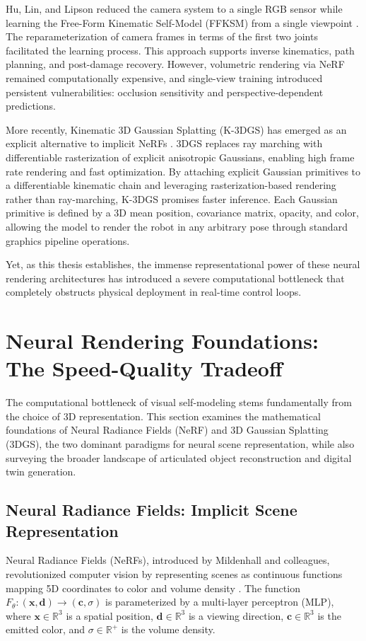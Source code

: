 \documentclass[12pt,a4paper,oneside]{report}
\begin{document}
Hu, Lin, and Lipson reduced the camera system to a single RGB sensor while learning the Free-Form Kinematic Self-Model (FFKSM) from a single viewpoint \cite{hu2024teaching}. The reparameterization of camera frames in terms of the first two joints facilitated the learning process. This approach supports inverse kinematics, path planning, and post-damage recovery. However, volumetric rendering via NeRF remained computationally expensive, and single-view training introduced persistent vulnerabilities: occlusion sensitivity and perspective-dependent predictions.

More recently, Kinematic 3D Gaussian Splatting (K-3DGS) has emerged as an explicit alternative to implicit NeRFs \cite{hu2025learning}. 3DGS replaces ray marching with differentiable rasterization of explicit anisotropic Gaussians, enabling high frame rate rendering and fast optimization. By attaching explicit Gaussian primitives to a differentiable kinematic chain and leveraging rasterization-based rendering rather than ray-marching, K-3DGS promises faster inference. Each Gaussian primitive is defined by a 3D mean position, covariance matrix, opacity, and color, allowing the model to render the robot in any arbitrary pose through standard graphics pipeline operations.

Yet, as this thesis establishes, the immense representational power of these neural rendering architectures has introduced a severe computational bottleneck that completely obstructs physical deployment in real-time control loops.

\section{Neural Rendering Foundations: The Speed-Quality Tradeoff}

The computational bottleneck of visual self-modeling stems fundamentally from the choice of 3D representation. This section examines the mathematical foundations of Neural Radiance Fields (NeRF) and 3D Gaussian Splatting (3DGS), the two dominant paradigms for neural scene representation, while also surveying the broader landscape of articulated object reconstruction and digital twin generation.

\subsection{Neural Radiance Fields: Implicit Scene Representation}

Neural Radiance Fields (NeRFs), introduced by Mildenhall and colleagues, revolutionized computer vision by representing scenes as continuous functions mapping 5D coordinates to color and volume density \cite{mildenhall2020nerf}. The function $F_\theta: (\mathbf{x}, \mathbf{d}) \rightarrow (\mathbf{c}, \sigma)$ is parameterized by a multi-layer perceptron (MLP), where $\mathbf{x} \in \mathbb{R}^3$ is a spatial position, $\mathbf{d} \in \mathbb{R}^3$ is a viewing direction, $\mathbf{c} \in \mathbb{R}^3$ is the emitted color, and $\sigma \in \mathbb{R}^+$ is the volume density.
\end{document}
